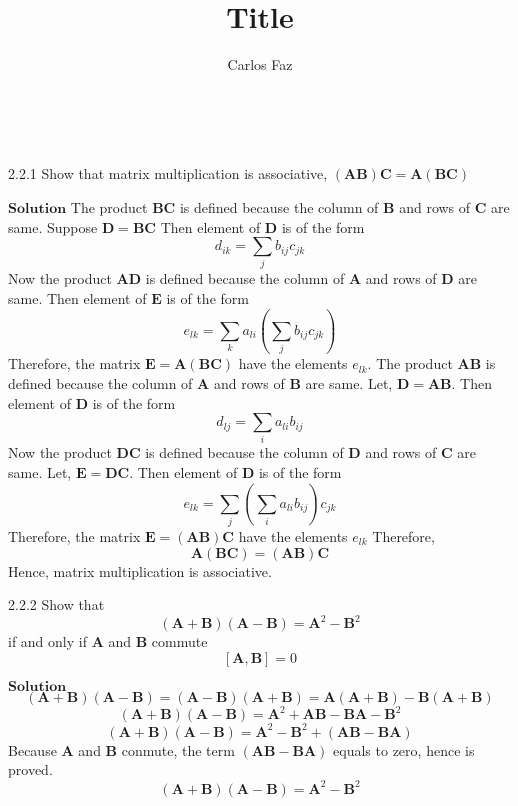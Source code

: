 \documentclass{article}
\title{Title}
\author{Carlos Faz}
\date{ \ }
\begin{document}
\begin{flushleft}


\begin{mybox}{2.2.1}
Show that matrix multiplication is associative, $(\mathbf{A}\mathbf{B}) \mathbf{C}=\mathbf{A}(\mathbf{B}\mathbf{C})$
\end{mybox}



$\boxed{\textbf{Solution}}$ The product $\mathbf{BC}$ is defined because the column of $\mathbf{B}$ and rows of $\mathbf{C}$ are same.
Suppose $\mathbf{D}=\mathbf{BC}$
Then element of $\mathbf{D}$ is of the form
$$d_{ik}=\sum_{j} b_{ij} c_{j k}$$
Now the product $\mathbf{AD}$ is defined because the column of $\mathbf{A}$ and rows of $\mathbf{D}$ are same. Then element of $\mathbf{E}$ is of the form
$$e_{l k}=\sum_{k} a_{l i}\left(\sum_{j} b_{i j} c_{j k}\right)$$
Therefore, the matrix $\mathbf{E}=\mathbf{A}(\mathbf{B} \mathbf{C})$ have the elements $e_{lk}$. The product $\mathbf{AB}$ is defined because the column of $\mathbf{A}$ and rows of $\mathbf{B}$ are same. Let, $\mathbf{D}=\mathbf{AB}$. Then element of $\mathbf{D}$ is of the form
$$d_{l j}=\sum_{i} a_{li} b_{i j}$$
Now the product $\mathbf{D C}$ is defined because the column of $\mathbf{D}$ and rows of $\mathbf{C}$ are same. Let, $\mathbf{E}=\mathbf{D C}$. Then element of $\mathbf{D}$ is of the form
$$e_{lk}=\sum_{j}\left(\sum_{i} a_{li} b_{i j}\right) c_{j k}$$
Therefore, the matrix $\mathbf{E}=(\mathbf{A} \mathbf{B}) \mathbf{C}$ have the elements $e_{lk}$
Therefore,
$$\mathbf{A}(\mathbf{B} \mathbf{C})=(\mathbf{A} \mathbf{B}) \mathbf{C}$$
Hence, matrix multiplication is associative.

\newpage


\begin{mybox}{2.2.2}
Show that
$$
(\mathbf{A}+\mathbf{B})(\mathbf{A}-\mathbf{B})=\mathbf{A}^{2}-\mathbf{B}^{2}
$$
if and only if $\mathbf{A}$ and $\mathbf{B}$ commute
$$[\mathbf{A}, \mathbf{B}]=0$$
\end{mybox}




$\boxed{\textbf{Solution}}$ 
$$(\mathbf{A}+\mathbf{B})(\mathbf{A}-\mathbf{B})=(\mathbf{A}-\mathbf{B})(\mathbf{A}+\mathbf{B})=\mathbf{A}(\mathbf{A}+\mathbf{B})-\mathbf{B}(\mathbf{A}+\mathbf{B})$$
$$(\mathbf{A}+\mathbf{B})(\mathbf{A}-\mathbf{B})=\mathbf{A}^2+\mathbf{A}\mathbf{B}-\mathbf{B}\mathbf{A}-\mathbf{B}^2$$
$$(\mathbf{A}+\mathbf{B})(\mathbf{A}-\mathbf{B})=\mathbf{A}^2-\mathbf{B}^2+(\mathbf{A}\mathbf{B}-\mathbf{B}\mathbf{A})$$
Because $\mathbf{A}$ and $\mathbf{B}$ conmute, the term $(\mathbf{A}\mathbf{B}-\mathbf{B}\mathbf{A})$ equals to zero, hence is proved.
$$(\mathbf{A}+\mathbf{B})(\mathbf{A}-\mathbf{B})=\mathbf{A}^2 -\mathbf{B}^2$$



\end{flushleft}
\end{document}
